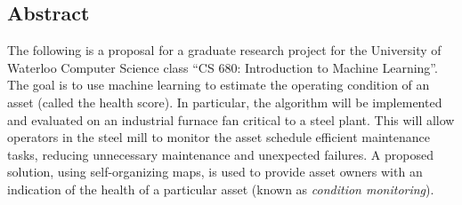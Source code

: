 \begin{center}
\section*{Abstract}
The following is a proposal for a graduate research project for the University of Waterloo Computer Science class ``CS 680: Introduction to Machine Learning''.
The goal is to use machine learning to estimate the operating condition of an asset (called the health score).
In particular, the algorithm will be implemented and evaluated on an industrial furnace fan critical to a steel plant.
This will allow operators in the steel mill to monitor the asset schedule efficient maintenance tasks, reducing unnecessary maintenance and unexpected failures.
A proposed solution, using self-organizing maps, is used to provide asset owners with an indication of the health of a particular asset (known as \textit{condition monitoring}).
\end{center}
